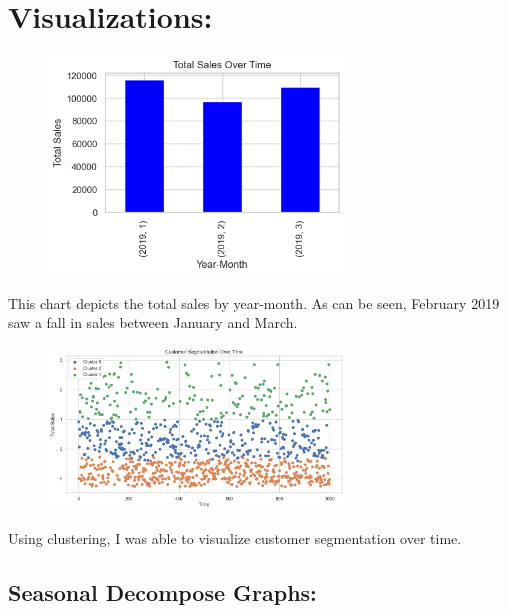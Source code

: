 \newpage
\section{Visualizations: }

\begin{figure}[h]
    \centering
    \includegraphics[width=0.7\textwidth]{Chapters/ch6/ch_6_bargraph_2.png}
\end{figure}
This chart depicts the total sales by year-month. As can be seen, February 2019 saw a fall in sales between January and March.
\newline 
\newline 
\begin{figure}[h]
    \centering
    \includegraphics[width=0.7\textwidth]{Chapters/ch6/ch_6_scatterplot.png}
\end{figure}

Using clustering, I was able to visualize customer segmentation over time.

\newpage 
\subsection{Seasonal Decompose Graphs:}

